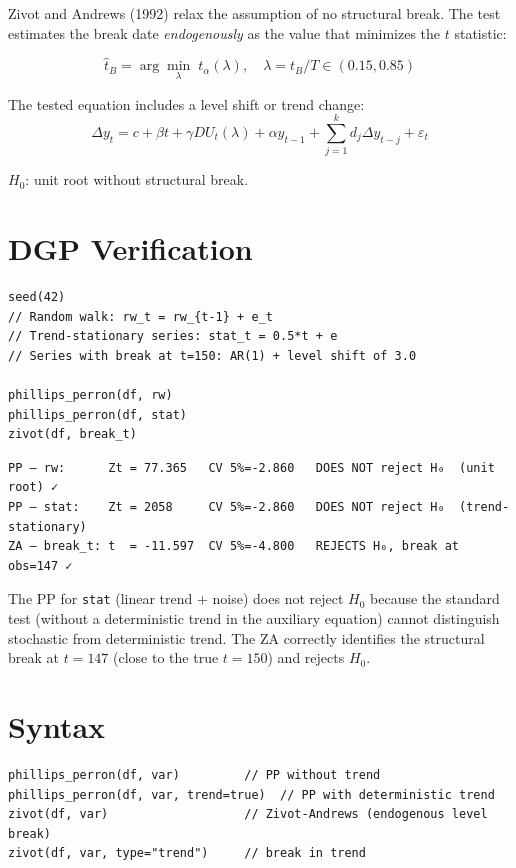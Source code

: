 Zivot and Andrews (1992) relax the assumption of no structural break.
The test estimates the break date \emph{endogenously} as the value that minimizes
the $t$ statistic:

\[
  \hat{t}_B = \arg\min_\lambda \; t_\alpha(\lambda), \quad \lambda = t_B/T \in (0.15, 0.85)
\]

The tested equation includes a level shift or trend change:
\[
  \Delta y_t = c + \beta t + \gamma D U_t(\lambda) + \alpha y_{t-1} + \sum_{j=1}^k d_j \Delta y_{t-j} + \varepsilon_t
\]

$H_0$: unit root without structural break.

\section{DGP Verification}

\begin{lstlisting}[caption={PP and Zivot-Andrews}]
seed(42)
// Random walk: rw_t = rw_{t-1} + e_t
// Trend-stationary series: stat_t = 0.5*t + e
// Series with break at t=150: AR(1) + level shift of 3.0

phillips_perron(df, rw)
phillips_perron(df, stat)
zivot(df, break_t)
\end{lstlisting}

\begin{lstlisting}[language={}, basicstyle=\ttfamily\small, frame=none,
  numbers=none, backgroundcolor=\color{codbg}]
PP — rw:      Zt = 77.365   CV 5%=-2.860   DOES NOT reject H₀  (unit root) ✓
PP — stat:    Zt = 2058     CV 5%=-2.860   DOES NOT reject H₀  (trend-stationary)
ZA — break_t: t  = -11.597  CV 5%=-4.800   REJECTS H₀, break at obs=147 ✓
\end{lstlisting}

The PP for \texttt{stat} (linear trend + noise) does not reject $H_0$ because the
standard test (without a deterministic trend in the auxiliary equation) cannot distinguish
stochastic from deterministic trend. The ZA correctly identifies the
structural break at $t=147$ (close to the true $t=150$) and rejects $H_0$.

\section{Syntax}

\begin{lstlisting}
phillips_perron(df, var)         // PP without trend
phillips_perron(df, var, trend=true)  // PP with deterministic trend
zivot(df, var)                   // Zivot-Andrews (endogenous level break)
zivot(df, var, type="trend")     // break in trend
\end{lstlisting}

